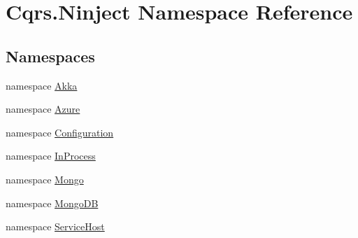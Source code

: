 \hypertarget{namespaceCqrs_1_1Ninject}{}\section{Cqrs.\+Ninject Namespace Reference}
\label{namespaceCqrs_1_1Ninject}
\subsection*{Namespaces}
\begin{DoxyCompactItemize}
\item 
namespace \hyperlink{namespaceCqrs_1_1Ninject_1_1Akka}{Akka}
\item 
namespace \hyperlink{namespaceCqrs_1_1Ninject_1_1Azure}{Azure}
\item 
namespace \hyperlink{namespaceCqrs_1_1Ninject_1_1Configuration}{Configuration}
\item 
namespace \hyperlink{namespaceCqrs_1_1Ninject_1_1InProcess}{In\+Process}
\item 
namespace \hyperlink{namespaceCqrs_1_1Ninject_1_1Mongo}{Mongo}
\item 
namespace \hyperlink{namespaceCqrs_1_1Ninject_1_1MongoDB}{Mongo\+DB}
\item 
namespace \hyperlink{namespaceCqrs_1_1Ninject_1_1ServiceHost}{Service\+Host}
\end{DoxyCompactItemize}
